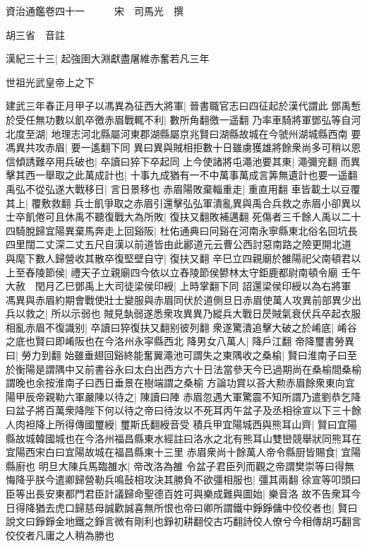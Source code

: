 資治通鑑卷四十一　　　宋　司馬光　撰

胡三省　音註

漢紀三十三|{
	起強圉大淵獻盡屠維赤奮若凡三年}


世祖光武皇帝上之下

建武三年春正月甲子以馮異為征西大將軍|{
	晉書職官志曰四征起於漢代謂此}
鄧禹慙於受任無功數以飢卒徼赤眉戰輒不利|{
	數所角翻徼一遥翻}
乃率車騎將軍鄧弘等自河北度至湖|{
	地理志河北縣屬河東郡湖縣屬京兆賢曰湖縣故城在今虢州湖城縣西南}
要馮異共攻赤眉|{
	要一遙翻下同}
異曰異與賊相拒數十日雖虜獲雄將餘衆尚多可稍以恩信傾誘難卒用兵破也|{
	卒讀曰猝下卒起同}
上今使諸將屯澠池要其東|{
	澠彌兖翻}
而異擊其西一舉取之此萬成計也|{
	十事九成猶有一不中萬事萬成言筭無遺計也要一遥翻}
禹弘不從弘遂大戰移日|{
	言日景移也}
赤眉陽敗棄輜重走|{
	重直用翻}
車皆載土以豆覆其上|{
	覆敷救翻}
兵士飢爭取之赤眉引還擊弘弘軍潰亂異與禹合兵救之赤眉小卻異以士卒飢倦可且休禹不聽復戰大為所敗|{
	復扶又翻敗補邁翻}
死傷者三千餘人禹以二十四騎脫歸宜陽異棄馬奔走上回谿阪|{
	杜佑通典曰冋谿在河南永寧縣東北俗名回坑長四里闊二丈深二丈五尺自漢以前道皆由此酈道元云曹公西討惡南路之險更開北道}
與麾下數人歸營收其散卒復堅壁自守|{
	復扶又翻}
辛巳立四親廟於雒陽祀父南頓君以上至舂陵節侯|{
	禮天子立親廟四今依以立舂陵節侯鬰林太守鉅鹿都尉南頓令廟}
壬午大赦　閏月乙巳鄧禹上大司徒梁侯印綬|{
	上時掌翻下同}
詔還梁侯印綬以為右將軍　馮異與赤眉約期會戰使壯士變服與赤眉同伏於道側旦日赤眉使萬人攻異前部異少出兵以救之|{
	所以示弱也}
賊見埶弱遂悉衆攻異異乃縱兵大戰日昃賊氣衰伏兵卒起衣服相亂赤眉不復識别|{
	卒讀曰猝復扶又翻别彼列翻}
衆遂驚潰追擊大破之於崤底|{
	崤谷之底也賢曰即崤阪也在今洛州永寜縣西北}
降男女八萬人|{
	降戶江翻}
帝降璽書勞異曰|{
	勞力到翻}
始雖垂翅回谿終能奮翼澠池可謂失之東隅收之桑榆|{
	賢曰淮南子曰至於衡陽是謂隅中又前書谷永曰太白出西方六十日法當參天今已過期尚在桑榆間桑榆謂晚也余按淮南子曰西日垂景在樹端謂之桑榆}
方論功賞以荅大勲赤眉餘衆東向宜陽甲辰帝親勒六軍嚴陳以待之|{
	陳讀曰陣}
赤眉忽遇大軍驚震不知所謂乃遣劉恭乞降曰盆子將百萬衆降陛下何以待之帝曰待汝以不死耳丙午盆子及丞相徐宣以下三十餘人肉袒降上所得傳國璽綬|{
	璽斯氏翻綬音受}
積兵甲宜陽城西與熊耳山齊|{
	賢曰宜陽縣故城韓國城也在今洛州福昌縣東水經註曰洛水之北有熊耳山雙巒競舉狀同熊耳在宜陽西宋白曰宜陽故城在福昌縣東十三里}
赤眉衆尚十餘萬人帝令縣厨皆賜食|{
	宜陽縣廚也}
明旦大陳兵馬臨雒水|{
	帝改洛為雒}
令盆子君臣列而觀之帝謂樊崇等曰得無悔降乎朕今遣卿歸營勒兵鳴鼔相攻決其勝負不欲彊相服也|{
	彊其兩翻}
徐宣等叩頭曰臣等出長安東都門君臣計議歸命聖德百姓可與樂成難與圖始|{
	樂音洛}
故不告衆耳今日得降猶去虎口歸慈母誠歡誠喜無所恨也帝曰卿所謂鐵中錚錚傭中佼佼者也|{
	賢曰說文曰錚錚金地鐵之錚言微有剛利也錚初耕翻佼古巧翻詩佼人僚兮今相傳胡巧翻言佼佼者凡庸之人稍為勝也}
